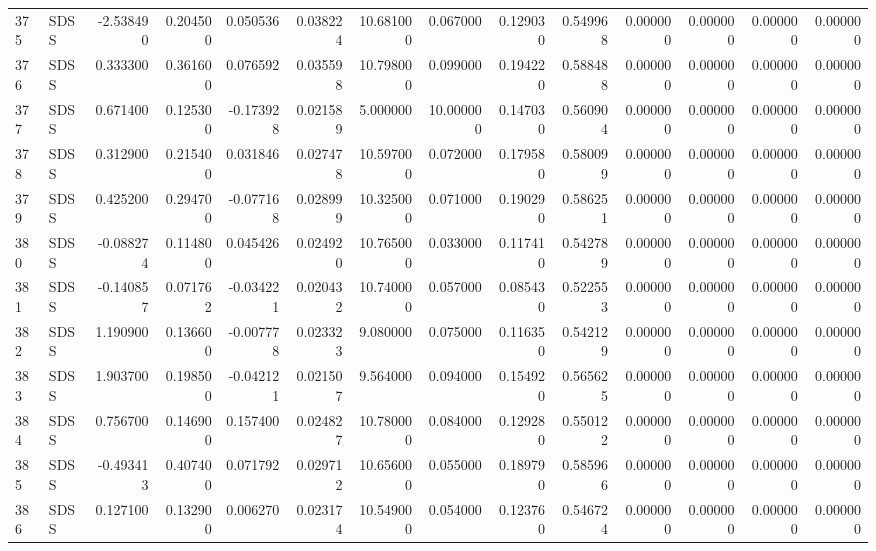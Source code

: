 \begin{tabular}{llrrrrrrrrrrrr}
375 &   SDSS & -2.538490 &      0.204500 &  0.050536 &    0.038224 &  10.681000 &      0.067000 &   0.129030 &  0.549968 &  0.000000 &   0.000000 &     0.000000 &     0.000000 \\
376 &   SDSS &  0.333300 &      0.361600 &  0.076592 &    0.035598 &  10.798000 &      0.099000 &   0.194220 &  0.588488 &  0.000000 &   0.000000 &     0.000000 &     0.000000 \\
377 &   SDSS &  0.671400 &      0.125300 & -0.173928 &    0.021589 &   5.000000 &     10.000000 &   0.147030 &  0.560904 &  0.000000 &   0.000000 &     0.000000 &     0.000000 \\
378 &   SDSS &  0.312900 &      0.215400 &  0.031846 &    0.027478 &  10.597000 &      0.072000 &   0.179580 &  0.580099 &  0.000000 &   0.000000 &     0.000000 &     0.000000 \\
379 &   SDSS &  0.425200 &      0.294700 & -0.077168 &    0.028999 &  10.325000 &      0.071000 &   0.190290 &  0.586251 &  0.000000 &   0.000000 &     0.000000 &     0.000000 \\
380 &   SDSS & -0.088274 &      0.114800 &  0.045426 &    0.024920 &  10.765000 &      0.033000 &   0.117410 &  0.542789 &  0.000000 &   0.000000 &     0.000000 &     0.000000 \\
381 &   SDSS & -0.140857 &      0.071762 & -0.034221 &    0.020432 &  10.740000 &      0.057000 &   0.085430 &  0.522553 &  0.000000 &   0.000000 &     0.000000 &     0.000000 \\
382 &   SDSS &  1.190900 &      0.136600 & -0.007778 &    0.023323 &   9.080000 &      0.075000 &   0.116350 &  0.542129 &  0.000000 &   0.000000 &     0.000000 &     0.000000 \\
383 &   SDSS &  1.903700 &      0.198500 & -0.042121 &    0.021507 &   9.564000 &      0.094000 &   0.154920 &  0.565625 &  0.000000 &   0.000000 &     0.000000 &     0.000000 \\
384 &   SDSS &  0.756700 &      0.146900 &  0.157400 &    0.024827 &  10.780000 &      0.084000 &   0.129280 &  0.550122 &  0.000000 &   0.000000 &     0.000000 &     0.000000 \\
385 &   SDSS & -0.493413 &      0.407400 &  0.071792 &    0.029712 &  10.656000 &      0.055000 &   0.189790 &  0.585966 &  0.000000 &   0.000000 &     0.000000 &     0.000000 \\
386 &   SDSS &  0.127100 &      0.132900 &  0.006270 &    0.023174 &  10.549000 &      0.054000 &   0.123760 &  0.546724 &  0.000000 &   0.000000 &     0.000000 &     0.000000 \\

\end{tabular}
